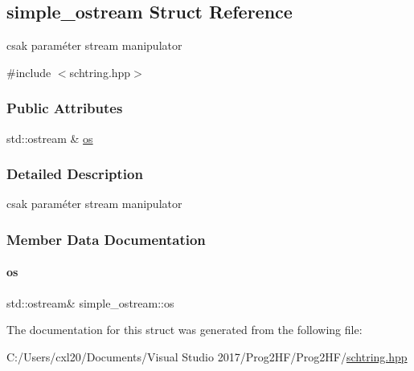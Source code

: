 \hypertarget{structsimple__ostream}{}\subsection{simple\+\_\+ostream Struct Reference}
\label{structsimple__ostream}


csak paraméter stream manipulator  




{\ttfamily \#include $<$schtring.\+hpp$>$}

\subsubsection*{Public Attributes}
\begin{DoxyCompactItemize}
\item 
std\+::ostream \& \mbox{\hyperlink{structsimple__ostream_a03c5c03d9aea0bfa4a4f403dff78f1ec}{os}}
\end{DoxyCompactItemize}


\subsubsection{Detailed Description}
csak paraméter stream manipulator 

\subsubsection{Member Data Documentation}
\mbox{\label{structsimple__ostream_a03c5c03d9aea0bfa4a4f403dff78f1ec}} 
\paragraph{\texorpdfstring{os}{os}}
{\footnotesize\ttfamily std\+::ostream\& simple\+\_\+ostream\+::os}



The documentation for this struct was generated from the following file\+:\begin{DoxyCompactItemize}
\item 
C\+:/\+Users/cxl20/\+Documents/\+Visual Studio 2017/\+Prog2\+H\+F/\+Prog2\+H\+F/\mbox{\hyperlink{schtring_8hpp}{schtring.\+hpp}}\end{DoxyCompactItemize}
